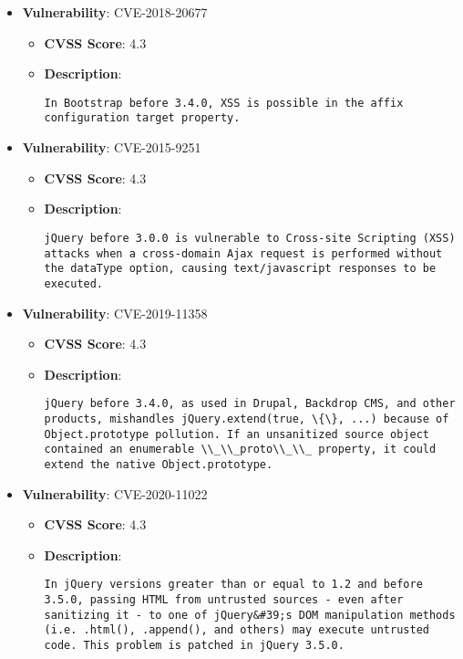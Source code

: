 \documentclass{article}
\begin{document}
\begin{itemize}
        \item \textbf{Vulnerability}: CVE-2018-20677
        \begin{itemize}
            \item \textbf{CVSS Score}:  4.3 
            \item \textbf{Description}:
            \parbox[t]{0.9\linewidth}{
                \verb|In Bootstrap before 3.4.0, XSS is possible in the affix configuration target property.|
            }
        \end{itemize}
    
        \item \textbf{Vulnerability}: CVE-2015-9251
        \begin{itemize}
            \item \textbf{CVSS Score}:  4.3 
            \item \textbf{Description}:
            \parbox[t]{0.9\linewidth}{
                \verb|jQuery before 3.0.0 is vulnerable to Cross-site Scripting (XSS) attacks when a cross-domain Ajax request is performed without the dataType option, causing text/javascript responses to be executed.|
            }
        \end{itemize}
    
        \item \textbf{Vulnerability}: CVE-2019-11358
        \begin{itemize}
            \item \textbf{CVSS Score}:  4.3 
            \item \textbf{Description}:
            \parbox[t]{0.9\linewidth}{
                \verb|jQuery before 3.4.0, as used in Drupal, Backdrop CMS, and other products, mishandles jQuery.extend(true, \{\}, ...) because of Object.prototype pollution. If an unsanitized source object contained an enumerable \\_\\_proto\\_\\_ property, it could extend the native Object.prototype.|
            }
        \end{itemize}
    
        \item \textbf{Vulnerability}: CVE-2020-11022
        \begin{itemize}
            \item \textbf{CVSS Score}:  4.3 
            \item \textbf{Description}:
            \parbox[t]{0.9\linewidth}{
                \verb|In jQuery versions greater than or equal to 1.2 and before 3.5.0, passing HTML from untrusted sources - even after sanitizing it - to one of jQuery&#39;s DOM manipulation methods (i.e. .html(), .append(), and others) may execute untrusted code. This problem is patched in jQuery 3.5.0.|
            }
        \end{itemize}
    

\end{itemize}
\end{document}
